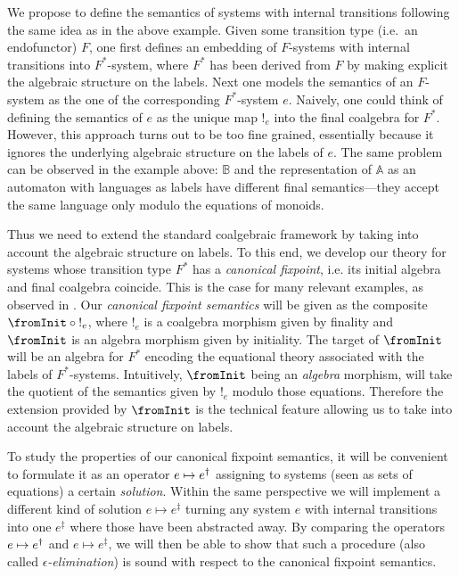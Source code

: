 \documentclass[oribibl,envcountsame,envcountsect,runningheads]{llncs}
\newcommand{\toFinal}[1]{{!_{#1}}}\DeclareMathSymbol{\fromInit}{\mathord}{operators}{"3C}
\renewcommand{\>}{\rangle}
\def\altsol#1{{#1}^\ddag}
\begin{document}
We propose to define the semantics of systems with internal transitions following the same idea as in the above example. Given some transition type (i.e.~an endofunctor) $F$, one first defines an embedding of $F$-systems with internal transitions into $F^*$-system, where $F^*$ has been derived from $F$ by making explicit the algebraic structure on the labels. Next one models the semantics of an $F$-system as the one of the corresponding $F^*$-system $e$. Naively, one could think of defining the semantics of $e$ as the unique map $\toFinal{e}$ into the final coalgebra for $F^*$. However, this approach turns out to be too fine grained, essentially because it ignores the underlying algebraic structure on the labels of $e$. The same problem can be observed in the example above: $\mathbb{B}$ and the representation of $\mathbb{A}$ as an automaton with languages as labels have different final semantics---they accept the same language only modulo the equations of monoids.

Thus we need to extend the standard coalgebraic framework by taking into account the algebraic structure on labels. To this end, we develop our theory for systems whose transition type $F^*$ has a \emph{canonical fixpoint}, i.e. its initial algebra and final coalgebra coincide. This is the case for many relevant examples, as observed in \cite{HasuoJS:07}. Our \emph{canonical fixpoint semantics} will be given as the composite $\fromInit \circ \toFinal{e}$, where $\toFinal{e}$ is a coalgebra morphism given by finality and $\fromInit$ is an algebra morphism given by initiality. The target of $\fromInit$ will be an algebra for $F^*$ encoding the equational theory associated with the labels of $F^*$-systems. Intuitively, $\fromInit$ being an \emph{algebra} morphism, will take the quotient of the semantics given by $\toFinal{e}$ modulo those equations. Therefore the extension provided by $\fromInit$ is the technical feature allowing us to take into account the algebraic structure on labels.

To study the properties of our canonical fixpoint semantics, it will be convenient to formulate it as an operator $e \mapsto {e}^\dag$ assigning to systems (seen as sets of equations) a certain \emph{solution}. Within the same perspective we will implement a different kind of solution $e \mapsto \altsol{e}$ turning any system $e$ with internal transitions into one $\altsol{e}$ where those have been abstracted away. By comparing the operators $e \mapsto {e}^\dag$ and $e \mapsto \altsol{e}$, we will then be able to show that such a procedure (also called \emph{$\epsilon$-elimination}) is sound with respect to the canonical fixpoint semantics.
\end{document}
